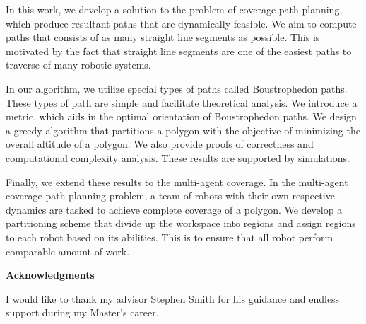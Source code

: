 In this work, we develop a solution to the problem of coverage path planning, which produce resultant paths that are dynamically feasible. We aim to compute paths that consists of as many straight line segments as possible. This is motivated by the fact that straight line segments are one of the easiest paths to traverse of many robotic systems. 

In our algorithm, we utilize special types of paths called Boustrophedon paths. These types of path are simple and facilitate theoretical analysis. We introduce a metric, which aids in the optimal orientation of Boustrophedon paths. We design a greedy algorithm that partitions a polygon with the objective of minimizing the overall altitude of a polygon. We also provide proofs of correctness and computational complexity analysis. These results are supported by simulations. 

Finally, we extend these results to the multi-agent coverage. In the multi-agent coverage path planning problem, a team of robots with their own respective dynamics are tasked to achieve complete coverage of a polygon. We develop a partitioning scheme that divide up the workspace into regions and assign regions to each robot based on its abilities. This is to ensure that all robot perform comparable amount of work.

\cleardoublepage


\begin{center}\textbf{Acknowledgments}\end{center}

I would like to thank my advisor Stephen Smith for his guidance and endless support during my Master's career. 
\cleardoublepage

%
%

\renewcommand\contentsname{Table of Contents}
\tableofcontents
\cleardoublepage
{}

\listoftables
\cleardoublepage
{}		%

\listoffigures
\cleardoublepage
{}		%



